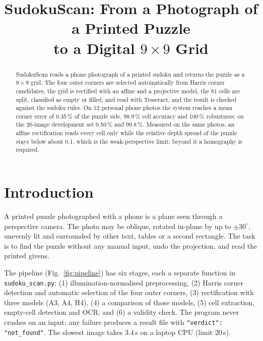 \documentclass[conference]{IEEEtran}
\begin{document}
\title{SudokuScan: From a Photograph of a Printed Puzzle\\to a Digital $9\times9$ Grid}

\author{
}

\maketitle

\begin{abstract}
SudokuScan reads a phone photograph of a printed sudoku and returns the puzzle as a $9\times9$
grid. The four outer corners are selected automatically from Harris corner candidates, the
grid is rectified with an affine and a projective model, the 81 cells are split, classified as
empty or filled, and read with Tesseract, and the result is checked against the sudoku rules.
On 12 personal phone photos the system reaches a mean corner error of 0.35\,\% of the puzzle
side, 98.9\,\% cell accuracy and 100\,\% robustness; on the 20-image development set 0.50\,\%
and 99.8\,\%. Measured on the same photos, an affine rectification reads every cell only while
the relative depth spread of the puzzle stays below about 0.1, which is the weak-perspective
limit; beyond it a homography is required.
\end{abstract}

\section{Introduction}
A printed puzzle photographed with a phone is a plane seen through a perspective camera. The
photo may be oblique, rotated in-plane by up to $\pm30^\circ$, unevenly lit and surrounded by
other text, tables or a second rectangle. The task is to find the puzzle without any manual
input, undo the projection, and read the printed givens.

The pipeline (Fig.~\ref{fig:pipeline}) has six stages, each a separate function in
\texttt{sudoku\_scan.py}: (1) illumination-normalised preprocessing, (2) Harris corner
detection and automatic selection of the four outer corners, (3) rectification with three
models (A3, A4, H4), (4) a comparison of those models, (5) cell extraction, empty-cell detection
and OCR, and (6) a validity check. The program never crashes on an input: any failure produces
a result file with \texttt{"verdict": "not\_found"}. The slowest image takes 3.4\,s on a laptop
CPU (limit 20\,s).
\end{document}
